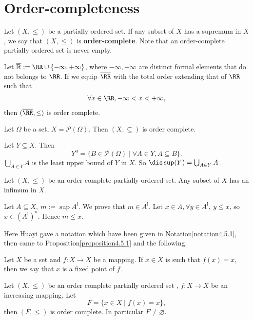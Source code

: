 \section{Order-completeness}
\begin{definitionenv}\label{4.8.1}
    Let $(X, \le)$ be a partially ordered set. If any subset of $X$ has a supremum in $X$,  we say that  $(X,  \le)$ is \textbf{order-complete}. Note that an order-complete
partially ordered set is never empty.
\end{definitionenv}
\begin{axiomenv}
    Let $\overline{\mathbb{R}}:=\RR\cup\{-\infty, +\infty\}$,  where $-\infty, +\infty$ are distinct formal elements that do not belongs to $\RR$. If we equip $\overline{\RR}$ with the total order extending that of $\RR$ such that 
    $$\forall x\in \RR, -\infty<x<+\infty, $$ 
    then $(\overline{\RR}, \le)$ is order complete.
\end{axiomenv}
\begin{exampleenv}
    Let $\Omega$ be a set, $X=\mathscr{P}(\Omega)$. Then $(X, \subseteq)$ is  order complete.
\end{exampleenv}
    \begin{proofenv}
        Let $Y\subseteq X$. Then 
        $$Y^{\mathrm{u}}=\{B\in\mathscr{P}(\Omega)\mid \forall A\in Y, A\subseteq B\}.$$
        $\displaystyle \bigcup_{A\in Y}A$ is the least upper bound of $Y$ in $X$. So $\dis \sup (Y)=\bigcup_{A\in Y}A$.
    \end{proofenv}
\begin{propositionenv}
    Let $(X, \le)$ be an order complete partially ordered set. Any subset of $X$ has an infimum in $X$.
\end{propositionenv}
\begin{proofenv}
    Let $A\subseteq X,\  m:=\sup A^\mathrm{l}$. We prove that $m\in A^\mathrm{l}$.
    \newline
    Let $x\in A, \forall y \in A^\mathrm{l},\  y\le x $,  so $x\in (A^\mathrm{l})^\mathrm{u}$. Hence $m\le x$.
\end{proofenv}
Here Huayi gave a notation which have been given in Notation\ref{notation4.5.1}, then came to Proposition\ref{proposition4.5.1} and the following.
\begin{definitionenv}
    Let $X$ be a set and $f:X\rightarrow X$ be a mapping. If $x\in X $ is such that $f(x)=x$,  then we say that $x$ is a fixed point of $f$. 
\end{definitionenv}
\begin{theoremenv}
    \quad
    \newline
    Let $(X, \le)$ be an order complete partially ordered set , $f:X\rightarrow X$ be an increasing mapping. Let 
    $$F=\{x\in X\mid f(x)=x\}, $$
    then $(F, \le)$ is order complete. In particular $F\not=\varnothing$.
    
\end{theoremenv}
